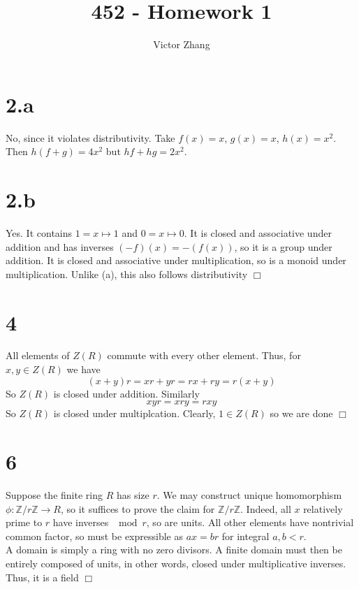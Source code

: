 \documentclass{article}
\title{452 - Homework 1}
\author{Victor Zhang}
\begin{document}
\maketitle

\section*{2.a}
No, since it violates distributivity. Take $f(x) = x$, $g(x) = x$, $h(x) = x^2$. Then $h(f+g) = 4x^2$ but $hf + hg = 2x^2$.
\section*{2.b}
Yes. It contains $1 = x \mapsto 1$ and $0 = x \mapsto 0$. It is closed and associative under addition and has inverses $(-f)(x) = -(f(x))$, so it is a group under addition. It is closed and associative under multiplication, so is a monoid under multiplication. Unlike (a), this also follows distributivity $\Box$

\section*{4}
All elements of $Z(R)$ commute with every other element. Thus, for $x,y \in Z(R)$ we have
$$(x+y)r = xr + yr = rx + ry = r(x+y)$$
So $Z(R)$ is closed under addition. Similarly
$$xyr = xry = rxy$$
So $Z(R)$ is closed under multiplcation. Clearly, $1 \in Z(R)$ so we are done $\Box$

\section*{6}
Suppose the finite ring $R$ has size $r$. We may construct unique homomorphism $\phi: \mathbb{Z}/r\mathbb{Z} \rightarrow R$, so it suffices to prove the claim for $\mathbb{Z}/r\mathbb{Z}$. Indeed, all $x$ relatively prime to $r$ have inverses $\mod r$, so are units. All other elements have nontrivial common factor, so must be expressible as $ax = br$ for integral $a,b < r$.\\
A domain is simply a ring with no zero divisors. A finite domain must then be entirely composed of units, in other words, closed under multiplicative inverses. Thus, it is a field $\Box$
\end{document}
